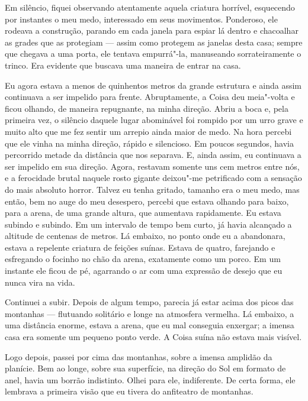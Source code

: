 Em silêncio, fiquei observando atentamente aquela criatura horrível, esquecendo por instantes o meu medo, interessado
em seus movimentos. Ponderoso, ele rodeava a construção, parando em cada janela para espiar lá dentro e
chacoalhar as grades que as protegiam --- assim como protegem as janelas desta casa; sempre que chegava a uma porta,
ele tentava empurrá"-la, manuseando sorrateiramente o trinco. Era evidente que buscava uma maneira de entrar na casa.

Eu agora estava a menos de quinhentos metros da grande estrutura e ainda assim continuava a ser impelido para frente.
Abruptamente, a Coisa deu meia"-volta e ficou olhando, de maneira repugnante, na minha direção. Abriu a boca e, pela
primeira vez, o silêncio daquele lugar abominável foi rompido por um urro grave e muito alto que me fez sentir um
arrepio ainda maior de medo. Na hora percebi que ele vinha na minha direção, rápido e silencioso. Em
poucos segundos, havia percorrido metade da distância que nos separava. E, ainda assim, eu continuava a ser impelido
em sua direção. Agora, restavam somente uns cem metros entre nós, e a ferocidade brutal naquele rosto gigante deixou"-me
petrificado com a sensação do mais absoluto horror. Talvez eu tenha gritado, tamanho era o meu medo, mas então, bem no
auge do meu desespero, percebi que estava olhando para baixo, para a arena, de uma grande altura, que aumentava
rapidamente. Eu estava subindo e subindo. Em um intervalo de tempo bem curto, já havia alcançado a altitude
de centenas de metros. Lá embaixo, no ponto onde eu a abandonara, estava a repelente criatura de feições suínas. Estava de
quatro, farejando e esfregando o focinho no chão da arena, exatamente como um porco. Em um instante ele ficou de pé,
agarrando o ar com uma expressão de desejo que eu nunca vira na vida.

Continuei a subir. Depois de algum tempo, parecia já estar acima dos picos das montanhas --- flutuando solitário e longe na
atmosfera vermelha. Lá embaixo, a uma distância enorme, estava a arena, que eu mal conseguia enxergar; a
imensa casa era somente um pequeno ponto verde. A Coisa suína não estava mais visível.

Logo depois, passei por cima das montanhas, sobre a imensa amplidão da planície. Bem ao longe, sobre sua superfície, na
direção do Sol em formato de anel, havia um borrão indistinto. Olhei para ele, indiferente. De certa forma, ele
lembrava a primeira visão que eu tivera do anfiteatro de montanhas.

